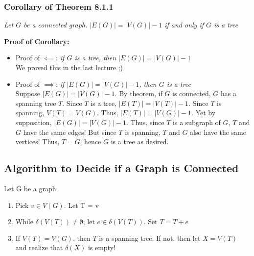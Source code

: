 \documentclass{report}
\begin{document}
\subsubsection{Corollary of Theorem 8.1.1}
\begin{center}
\textit{Let $G$ be a connected graph. $\vert E(G) \vert = \vert V(G)\vert - 1$ if and only if $G$ is a tree}
\end{center}
\textbf{Proof of Corollary:}\\
\begin{itemize}
\item Proof of $\impliedby$: \textit{if $G$ is a tree, then $\vert E(G)\vert = \vert V(G)\vert - 1$}\\
We proved this in the last lecture ;)
\item Proof of $\implies$: \textit{if $\vert E(G)\vert = \vert V(G)\vert - 1$, then $G$ is a tree}\\
Suppose $\vert E(G)\vert = \vert V(G)\vert - 1$. By theorem, if $G$ is connected, $G$ has a spanning tree $T$. Since $T$ is a tree, $\vert E(T)\vert = \vert V(T)\vert - 1$. Since $T$ is spanning, $V(T) = V(G)$. Thus, $\vert E(T)\vert = \vert V(G)\vert - 1$. Yet by supposition, $\vert E(G)\vert = \vert V(G)\vert - 1$. Thus, since $T$ is a subgraph of $G$, $T$ and $G$ have the same edges! But since $T$ is spanning, $T$ and $G$ also have the same vertices! Thus, $T = G$, hence $G$ is a tree as desired.
\end{itemize}

\subsection{Algorithm to Decide if a Graph is Connected}
Let G be a graph
\begin{enumerate}
\item Pick $v \in V(G)$. Let T = v
\item While $\delta(V(T)) \neq \emptyset$; let $e \in \delta(V(T))$. Set $T = T +e$ 
\item If $V(T) = V(G)$, then $T$ is a spanning tree. If not, then let $X = V(T)$ and realize that $\delta(X)$ is empty!
\end{enumerate}
\end{document}
